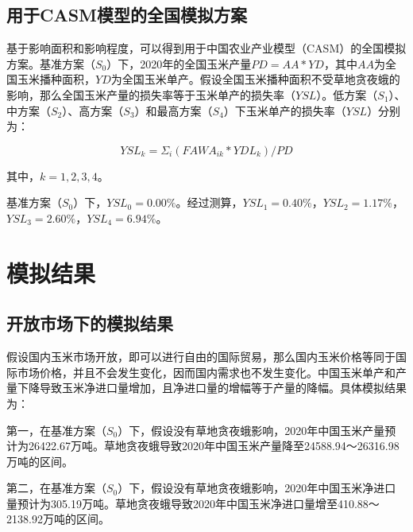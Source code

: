 \documentclass{progbookcn}
\begin{document}
\subsection{用于CASM模型的全国模拟方案}
基于影响面积和影响程度，可以得到用于中国农业产业模型（CASM）的全国模拟方案。基准方案（$S_0$）下，2020年的全国玉米产量$PD=AA*YD$，其中$AA$为全国玉米播种面积，$YD$为全国玉米单产。假设全国玉米播种面积不受草地贪夜蛾的影响，那么全国玉米产量的损失率等于玉米单产的损失率（$YSL$）。低方案（$S_1$）、中方案（$S_2$）、高方案（$S_3$）和最高方案（$S_4$）下玉米单产的损失率（$YSL$）分别为：

\[YSL_k=\Sigma_i (FAWA_{ik}*YDL_k)/PD\]

其中，$k=1,2,3,4$。

基准方案（$S_0$）下，$YSL_0=0.00\%$。经过测算，$YSL_1=0.40\%$，$YSL_2=1.17\%$，$YSL_3=2.60\%$，$YSL_4=6.94\%$。

\section{模拟结果}
\subsection{开放市场下的模拟结果}
假设国内玉米市场开放，即可以进行自由的国际贸易，那么国内玉米价格等同于国际市场价格，并且不会发生变化，因而国内需求也不发生变化。中国玉米单产和产量下降导致玉米净进口量增加，且净进口量的增幅等于产量的降幅。具体模拟结果为：

第一，在基准方案（$S_0$）下，假设没有草地贪夜蛾影响，2020年中国玉米产量预计为26422.67万吨。草地贪夜蛾导致2020年中国玉米产量降至24588.94～26316.98万吨的区间。

第二，在基准方案（$S_0$）下，假设没有草地贪夜蛾影响，2020年中国玉米净进口量预计为305.19万吨。草地贪夜蛾导致2020年中国玉米净进口量增至410.88～2138.92万吨的区间。
\end{document}
